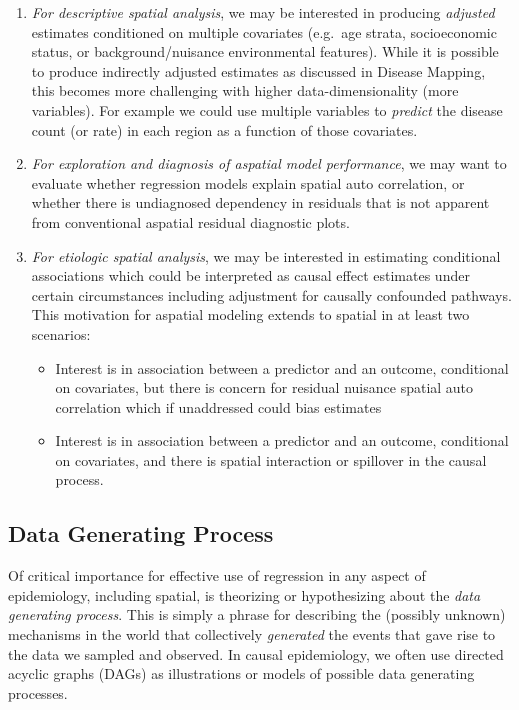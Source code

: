 \documentclass[
]{book}
\providecommand{\tightlist}{%
  \setlength{\itemsep}{0pt}\setlength{\parskip}{0pt}}
\begin{document}
\begin{enumerate}
\def\labelenumi{\arabic{enumi}.}
\tightlist
\item
  \emph{For descriptive spatial analysis}, we may be interested in producing \emph{adjusted} estimates conditioned on multiple covariates (e.g.~age strata, socioeconomic status, or background/nuisance environmental features). While it is possible to produce indirectly adjusted estimates as discussed in Disease Mapping, this becomes more challenging with higher data-dimensionality (more variables). For example we could use multiple variables to \emph{predict} the disease count (or rate) in each region as a function of those covariates.
\item
  \emph{For exploration and diagnosis of aspatial model performance}, we may want to evaluate whether regression models explain spatial auto correlation, or whether there is undiagnosed dependency in residuals that is not apparent from conventional aspatial residual diagnostic plots.
\item
  \emph{For etiologic spatial analysis}, we may be interested in estimating conditional associations which could be interpreted as causal effect estimates under certain circumstances including adjustment for causally confounded pathways. This motivation for aspatial modeling extends to spatial in at least two scenarios:

  \begin{itemize}
  \tightlist
  \item
    Interest is in association between a predictor and an outcome, conditional on covariates, but there is concern for residual nuisance spatial auto correlation which if unaddressed could bias estimates
  \item
    Interest is in association between a predictor and an outcome, conditional on covariates, and there is spatial interaction or spillover in the causal process.
  \end{itemize}
\end{enumerate}

\hypertarget{data-generating-process}{%
\subsection{Data Generating Process}\label{data-generating-process}}

Of critical importance for effective use of regression in any aspect of epidemiology, including spatial, is theorizing or hypothesizing about the \emph{data generating process}. This is simply a phrase for describing the (possibly unknown) mechanisms in the world that collectively \emph{generated} the events that gave rise to the data we sampled and observed. In causal epidemiology, we often use directed acyclic graphs (DAGs) as illustrations or models of possible data generating processes.
\end{document}
